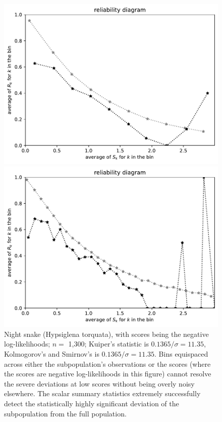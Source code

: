 \documentclass{article}
\begin{document}
\begin{figure}
\begin{centering}
\parbox{\imsize}{\includegraphics[width=\imsize]
       {./codes/unweighted/nll-1-60-night-snake-Hypsiglena-torquataequiscore10}}
\quad\quad
\parbox{\imsize}{\includegraphics[width=\imsize]
       {./codes/unweighted/nll-1-60-night-snake-Hypsiglena-torquataequiscore30}}

\end{centering}
\caption{Night snake (Hypsiglena torquata),
         with scores being the negative log-likelihoods;
         $n =$ 1,300; Kuiper's statistic is $0.1365 / \sigma = 11.35$,
         Kolmogorov's and Smirnov's is $0.1365 / \sigma = 11.35$.
Bins equispaced across either the subpopulation's observations or the scores
(where the scores are negative log-likelihoods in this figure)
cannot resolve the severe deviations at low scores
without being overly noisy elsewhere.
The scalar summary statistics extremely successfully
detect the statistically highly significant deviation
of the subpopulation from the full population.
}
\label{night-snake-Hypsiglena-torquata-nll}
\end{figure}
\end{document}
